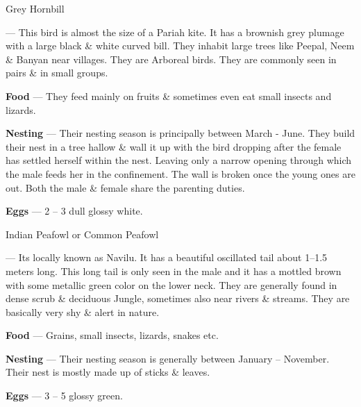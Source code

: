 \begin{bird}{Grey Hornbill}

 --- This bird is almost the size of a Pariah kite. It has a brownish grey plumage with a large black \& white curved bill. They inhabit large trees like Peepal, Neem \& Banyan near villages. They are Arboreal birds. They are commonly seen in pairs \& in small groups.

{\large\bf Food} --- They feed mainly on fruits \& sometimes even eat small insects and lizards.

{\large\bf Nesting} --- Their nesting season is principally between March - June. They build their nest in a tree hallow \& wall it up with the bird dropping after the female has settled herself within the nest. Leaving only a narrow opening through which the male feeds her in the confinement. The wall is broken once the young ones are out. Both the male \& female share the parenting duties.

{\large\bf Eggs} --- 2 -- 3 dull glossy white.
\end{bird}


\begin{bird}{Indian Peafowl or Common Peafowl}

 --- Its locally known as Navilu. It has a beautiful oscillated tail about 1--1.5 meters long. This long tail is only seen in the male and it has a mottled brown with some metallic green color on the lower neck. They are generally found in dense scrub \& deciduous Jungle, sometimes also near rivers \& streams. They are basically very shy \& alert in nature.

{\large\bf Food} --- Grains, small insects, lizards, snakes etc.

{\large\bf Nesting} --- Their nesting season is generally between January -- November. Their nest is mostly made up of sticks \& leaves.

{\large\bf Eggs} --- 3 -- 5 glossy green.
\end{bird}

